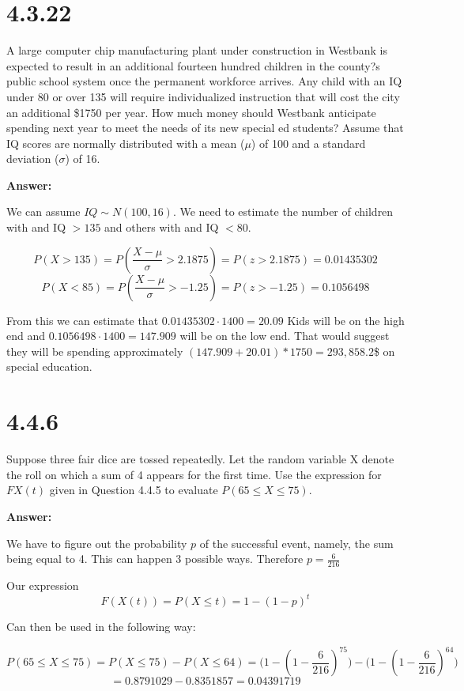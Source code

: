 \documentclass[svgnames]{article}
\begin{document}
\section{4.3.22}
 A large computer chip manufacturing plant under construction in Westbank is expected to result in an additional fourteen hundred children in the county?s public school system once the permanent workforce arrives. Any child with an IQ under 80 or over 135 will require individualized instruction that will cost the city an additional \$1750 per year. How much money should Westbank anticipate spending next year to meet the needs of its new special ed students? Assume that IQ scores are normally distributed with a mean ($\mu$) of 100 and a standard deviation ($\sigma$) of 16.

\textbf{Answer:}

We can assume $IQ \sim N(100,16)$. We need to estimate the number of children with and IQ $>135$ and others with and IQ $< 80$.

$$P(X>135) = P(\frac{X - \mu}{\sigma}> 2.1875)=P(z>  2.1875)=0.01435302$$
$$P(X<85) = P(\frac{X - \mu}{\sigma}>-1.25)=P(z> -1.25)=0.1056498$$

From this we can estimate that $0.01435302\cdot 1400=20.09$ Kids will be on the high end and  $0.1056498\cdot 1400=147.909$ will be on the low end. That would suggest they will be spending approximately $(147.909 + 20.01)*1750=293,858.2$\$ on special education.


\section{4.4.6}
Suppose three fair dice are tossed repeatedly. Let the random variable X denote the roll on which a sum of 4 appears for the first time. Use the expression for $FX(t)$ given in Question 4.4.5 to evaluate $P(65 \leq X \leq 75)$.

\textbf{Answer:}

We have to figure out the probability $p$ of the successful event, namely, the sum being equal to 4. This can happen 3 possible ways. Therefore $p=\frac{6}{216}$ 

Our expression
$$F(X(t)) = P(X \leq t) = 1 - (1 - p)^t $$

Can then be used in the following way:

\[P(65\leq X \leq75)=P(X\leq75)-P(X\leq64) = \Big(1 - (1 -\frac{6}{216})^{75}\Big) -\Big(1 - (1 -\frac{6}{216})^{64}\Big)\]
\[=0.8791029-0.8351857=0.04391719\]
\end{document}
